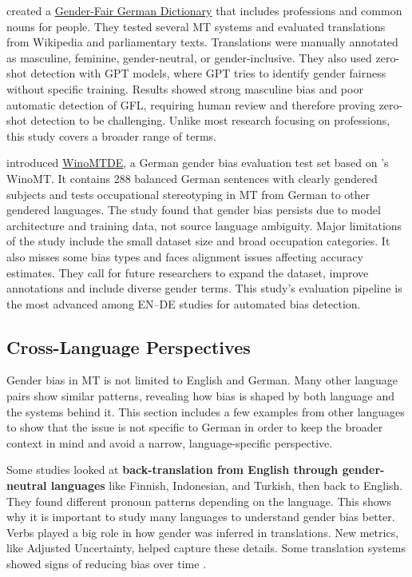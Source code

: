 \textbf{\citet{lardelliBuildingBridgesDataset2024}} created a \href{https://github.com/g8a9/building-bridges-gender-fair-german-mt}{Gender-Fair German Dictionary} that includes professions and common nouns for people. They tested several MT systems and evaluated translations from Wikipedia and parliamentary texts. Translations were manually annotated as masculine, feminine, gender-neutral, or gender-inclusive. They also used zero-shot detection with GPT models, where GPT tries to identify gender fairness without specific training. Results showed strong masculine bias and poor automatic detection of GFL, requiring human review and therefore proving zero-shot detection to be challenging. Unlike most research focusing on professions, this study covers a broader range of terms.

\textbf{\citet{kapplAreAllSpanish2025}} introduced \href{https://github.com/michellekappl/mt_gender_german}{WinoMTDE}, a German gender bias evaluation test set based on \citealp{stanovskyEvaluatingGenderBias2019}'s WinoMT. It contains 288 balanced German sentences with clearly gendered subjects and tests occupational stereotyping in MT from German to other gendered languages. The study found that gender bias persists due to model architecture and training data, not source language ambiguity. Major limitations of the study include the small dataset size and broad occupation categories. It also misses some bias types and faces alignment issues affecting accuracy estimates. They call for future researchers to expand the dataset, improve annotations and include diverse gender terms. This study's evaluation pipeline is the most advanced among EN–DE studies for automated bias detection.

\subsection{Cross-Language Perspectives}
Gender bias in MT is not limited to English and German. Many other language pairs show similar patterns, revealing how bias is shaped by both language and the systems behind it. This section includes a few examples from other languages to show that the issue is not specific to German in order to keep the broader context in mind and avoid a narrow, language-specific perspective.

Some studies looked at \textbf{back-translation from English through gender-neutral languages} like Finnish, Indonesian, and Turkish, then back to English. They found different pronoun patterns depending on the language. This shows why it is important to study many languages to understand gender bias better. Verbs played a big role in how gender was inferred in translations. New metrics, like Adjusted Uncertainty, helped capture these details. Some translation systems showed signs of reducing bias over time \citep{barclayInvestigatingMarkersDrivers2024a}.

